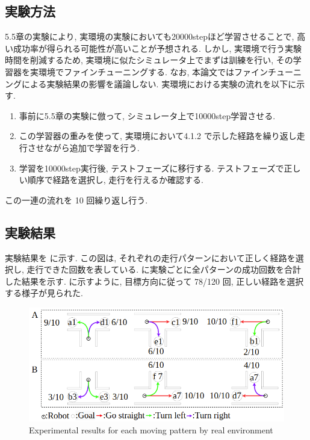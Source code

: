 \subsection{実験方法}
5.5章の実験により, 実環境の実験においても20000stepほど学習させることで, 高い成功率が得られる可能性が高いことが予想される. しかし, 実環境で行う実験時間を削減するため, 実環境に似たシミュレータ上でまずは訓練を行い, その学習器を実環境でファインチューニングする. なお, 本論文ではファインチューニングによる実験結果の影響を議論しない. 実環境における実験の流れを以下に示す.
\begin{enumerate}
  \item 事前に5.5章の実験に倣って, シミュレータ上で10000step学習させる. 
  \item この学習器の重みを使って, 実環境において4.1.2 で示した経路を繰り返し走行させながら追加で学習を行う.
  \item 学習を10000step実行後, テストフェーズに移行する. テストフェーズで正しい順序で経路を選択し, 走行を行えるか確認する.
\end{enumerate}
この一連の流れを 10 回繰り返し行う.

\subsection{実験結果}
実験結果を  に示す. この図は, それぞれの走行パターンにおいて正しく経路を選択し, 走行できた回数を表している.  に実験ごとに全パターンの成功回数を合計した結果を示す.  に示すように, 目標方向に従って 78/120 回, 正しい経路を選択する様子が見られた.

\begin{figure}[hbtp]
  \centering
 \includegraphics[keepaspectratio, scale=0.45]
      {images/real_result.png}
 \caption{Experimental results for each moving pattern by real environment}
 \label{Fig:real_result}
\end{figure}

